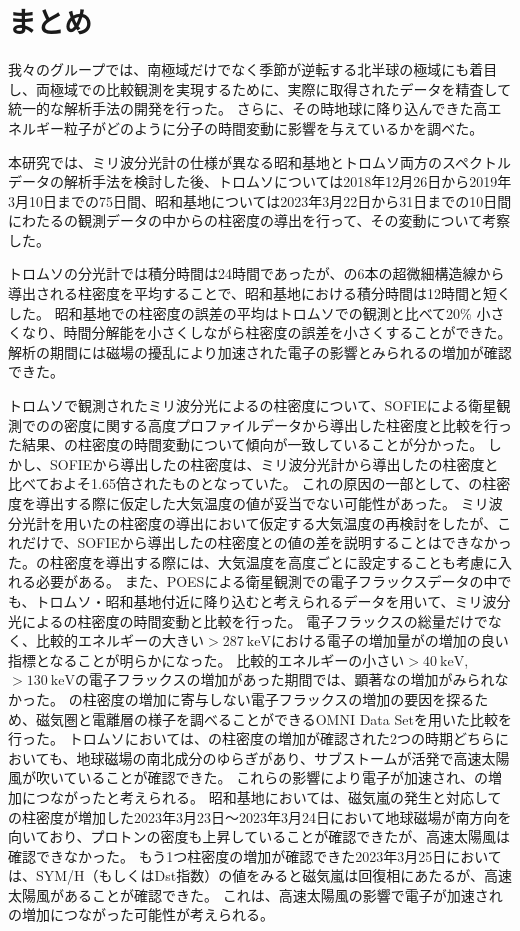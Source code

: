 \chapter{まとめ}
我々のグループでは、南極域だけでなく季節が逆転する北半球の極域にも着目し、両極域での比較観測を実現するために、実際に取得されたデータを精査して統一的な解析手法の開発を行った。
さらに、その時地球に降り込んできた高エネルギー粒子がどのように分子の時間変動に影響を与えているかを調べた。
\par
本研究では、ミリ波分光計の仕様が異なる昭和基地とトロムソ両方のスペクトルデータの解析手法を検討した後、トロムソについては2018年12月26日から2019年3月10日までの75日間、昭和基地については2023年3月22日から31日までの10日間にわたるの観測データの中からの柱密度の導出を行って、その変動について考察した。
\par
トロムソの分光計では積分時間は24時間であったが、の6本の超微細構造線から導出される柱密度を平均することで、昭和基地における積分時間は12時間と短くした。
昭和基地での柱密度の誤差の平均はトロムソでの観測と比べて20\% 小さくなり、時間分解能を小さくしながら柱密度の誤差を小さくすることができた。
解析の期間には磁場の擾乱により加速された電子の影響とみられるの増加が確認できた。
\par
トロムソで観測されたミリ波分光によるの柱密度について、SOFIEによる衛星観測でのの密度に関する高度プロファイルデータから導出した柱密度と比較を行った結果、の柱密度の時間変動について傾向が一致していることが分かった。
しかし、SOFIEから導出したの柱密度は、ミリ波分光計から導出したの柱密度と比べておよそ1.65倍されたものとなっていた。
これの原因の一部として、の柱密度を導出する際に仮定した大気温度の値が妥当でない可能性があった。
ミリ波分光計を用いたの柱密度の導出において仮定する大気温度の再検討をしたが、これだけで、SOFIEから導出したの柱密度との値の差を説明することはできなかった。の柱密度を導出する際には、大気温度を高度ごとに設定することも考慮に入れる必要がある。
また、POESによる衛星観測での電子フラックスデータの中でも、トロムソ・昭和基地付近に降り込むと考えられるデータを用いて、ミリ波分光によるの柱密度の時間変動と比較を行った。
電子フラックスの総量だけでなく、比較的エネルギーの大きい$>287\ \mathrm{keV}$における電子の増加量がの増加の良い指標となることが明らかになった。
比較的エネルギーの小さい$>40\ \mathrm{keV}$, $>130\ \mathrm{keV}$の電子フラックスの増加があった期間では、顕著なの増加がみられなかった。
の柱密度の増加に寄与しない電子フラックスの増加の要因を探るため、磁気圏と電離層の様子を調べることができるOMNI Data Setを用いた比較を行った。
トロムソにおいては、の柱密度の増加が確認された2つの時期どちらにおいても、地球磁場の南北成分のゆらぎがあり、サブストームが活発で高速太陽風が吹いていることが確認できた。
これらの影響により電子が加速され、の増加につながったと考えられる。
昭和基地においては、磁気嵐の発生と対応しての柱密度が増加した2023年3月23日〜2023年3月24日において地球磁場が南方向を向いており、プロトンの密度も上昇していることが確認できたが、高速太陽風は確認できなかった。
もう1つ柱密度の増加が確認できた2023年3月25日においては、SYM/H（もしくはDst指数）の値をみると磁気嵐は回復相にあたるが、高速太陽風があることが確認できた。
これは、高速太陽風の影響で電子が加速されの増加につながった可能性が考えられる。
